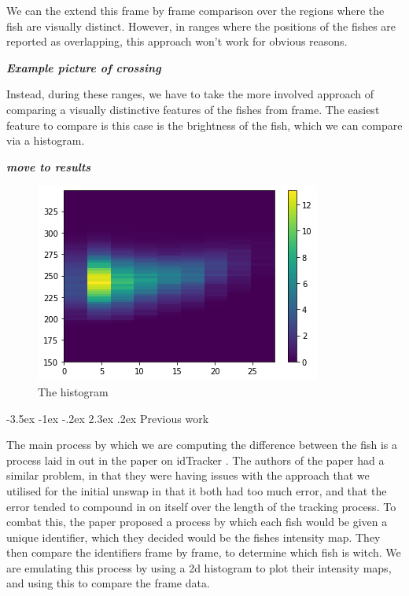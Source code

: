 \documentclass{article}
\makeatletter
\renewcommand\section{\clearpage\newpage\@startsection {section}{1}{\z@}%
	{-3.5ex \@plus -1ex \@minus -.2ex}%
	{2.3ex \@plus.2ex}%
	{\normalfont\Large\bfseries}}
\makeatother
\begin{document}
We can the extend this frame by frame comparison over the regions where the fish are visually distinct. However, in ranges where the positions of the fishes are reported as overlapping, this approach won't work for obvious reasons. 

\textbf{\textit{Example picture of crossing}}

Instead, during these ranges, we have to take the more involved approach of comparing a visually distinctive features of the fishes from frame. The easiest feature to compare is this case is the brightness of the fish, which we can compare via a histogram.

\textbf{\textit{move to results}}

\begin{figure}[H]
	\centering
	\includegraphics[width=.75\linewidth]{hist}
	\caption{The histogram}
	\label{fig:hist}
\end{figure}


\section{Previous work}

The main process by which we are computing the difference between the fish is a process laid in out in the paper on idTracker \cite{idTracker}. The authors of the paper had a similar problem, in that they were having issues with the approach that we utilised for the initial unswap in that it both had too much error, and that the error tended to compound in on itself over the length of the tracking process. To combat this, the paper proposed a process by which each fish would be given a unique identifier, which they decided would be the fishes intensity map. They then compare the identifiers frame by frame, to determine which fish is witch. We are emulating this process by using a 2d histogram to plot their intensity maps, and using this to compare the frame data.
\end{document}
